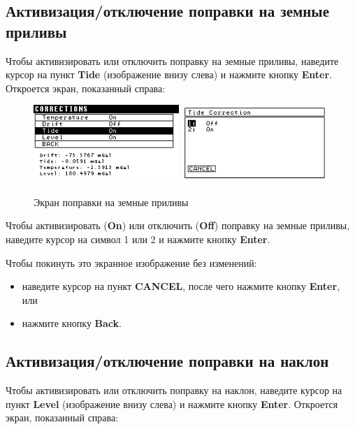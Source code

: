 \subsection{Активизация/отключение поправки на земные приливы}

Чтобы активизировать или отключить поправку на земные приливы, наведите курсор
на пункт \textbf{Tide} (изображение внизу слева) и нажмите кнопку
\textbf{Enter}. Откроется экран, показанный справа:

\begin{figure}[H]
  \centering
  \includegraphics[width=0.49\textwidth]{figures/the_tide_correction_screen_1}
  \includegraphics[width=0.49\textwidth]{figures/the_tide_correction_screen_2}
  \caption{Экран поправки на земные приливы}
  \label{fig:the_tide_correction_screen}
\end{figure}

Чтобы активизировать (\textbf{On}) или отключить (\textbf{Off}) поправку на
земные приливы, наведите курсор на символ 1 или 2 и нажмите кнопку
\textbf{Enter}.

Чтобы покинуть это экранное изображение без изменений:
\begin{itemize}
  \item наведите курсор на пункт \textbf{CANCEL}, после чего нажмите кнопку
    \textbf{Enter}, или

  \item нажмите кнопку \textbf{Back}.
\end{itemize}

\subsection{Активизация/отключение поправки на наклон}

Чтобы активизировать или отключить поправку на наклон, наведите курсор на пункт
\textbf{Level} (изображение внизу слева) и нажмите кнопку \textbf{Enter}.
Откроется экран, показанный справа:

